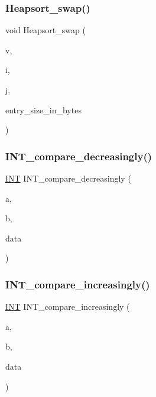 \subsubsection{\texorpdfstring{Heapsort\+\_\+swap()}{Heapsort\_swap()}}
{\footnotesize\ttfamily void Heapsort\+\_\+swap (\begin{DoxyParamCaption}\item[{void $\ast$}]{v,  }\item[{\mbox{\hyperlink{galois_8h_a09fddde158a3a20bd2dcadb609de11dc}{I\+NT}}}]{i,  }\item[{\mbox{\hyperlink{galois_8h_a09fddde158a3a20bd2dcadb609de11dc}{I\+NT}}}]{j,  }\item[{\mbox{\hyperlink{galois_8h_a09fddde158a3a20bd2dcadb609de11dc}{I\+NT}}}]{entry\+\_\+size\+\_\+in\+\_\+bytes }\end{DoxyParamCaption})}

\mbox{\label{sorting_8_c_a41cf7fa2b53a8f12d60971a71ba96a66}} 
\subsubsection{\texorpdfstring{I\+N\+T\+\_\+compare\+\_\+decreasingly()}{INT\_compare\_decreasingly()}}
{\footnotesize\ttfamily \mbox{\hyperlink{galois_8h_a09fddde158a3a20bd2dcadb609de11dc}{I\+NT}} I\+N\+T\+\_\+compare\+\_\+decreasingly (\begin{DoxyParamCaption}\item[{void $\ast$}]{a,  }\item[{void $\ast$}]{b,  }\item[{void $\ast$}]{data }\end{DoxyParamCaption})}

\mbox{\label{sorting_8_c_a53c48a8669e34ab2171690080d493f31}} 
\subsubsection{\texorpdfstring{I\+N\+T\+\_\+compare\+\_\+increasingly()}{INT\_compare\_increasingly()}}
{\footnotesize\ttfamily \mbox{\hyperlink{galois_8h_a09fddde158a3a20bd2dcadb609de11dc}{I\+NT}} I\+N\+T\+\_\+compare\+\_\+increasingly (\begin{DoxyParamCaption}\item[{void $\ast$}]{a,  }\item[{void $\ast$}]{b,  }\item[{void $\ast$}]{data }\end{DoxyParamCaption})}

